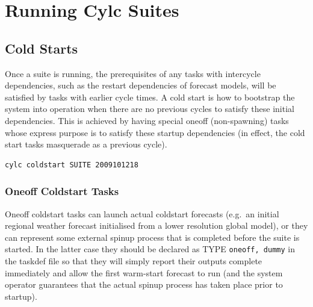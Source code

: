 \documentclass[11pt,a4paper]{article}
\begin{document}
%



\pagebreak
\section{Running Cylc Suites}
\label{RunningCylcSuites}

\subsection{Cold Starts}

Once a suite is running, the prerequisites of any tasks with intercycle
dependencies, such as the restart dependencies of forecast models, will
be satisfied by tasks with earlier cycle times. A cold start is how to
bootstrap the system into operation when there are no previous cycles to
satisfy these initial dependencies. This is achieved by having special
oneoff (non-spawning) tasks whose express purpose is to satisfy these
startup dependencies (in effect, the cold start tasks masquerade as a
previous cycle).

\begin{lstlisting}
cylc coldstart SUITE 2009101218
\end{lstlisting}

\subsubsection{Oneoff Coldstart Tasks}

Oneoff coldstart tasks can launch actual coldstart forecasts (e.g.\ an
initial regional weather forecast initialised from a lower resolution
global model), or they can represent some external spinup process that
is completed before the suite is started. In the latter case they should
be declared as TYPE \lstinline=oneoff, dummy= in the taskdef file so
that they will simply report their outputs complete immediately and
allow the first warm-start forecast to run (and the system operator
guarantees that the actual spinup process has taken place prior to
startup).
\end{document}
